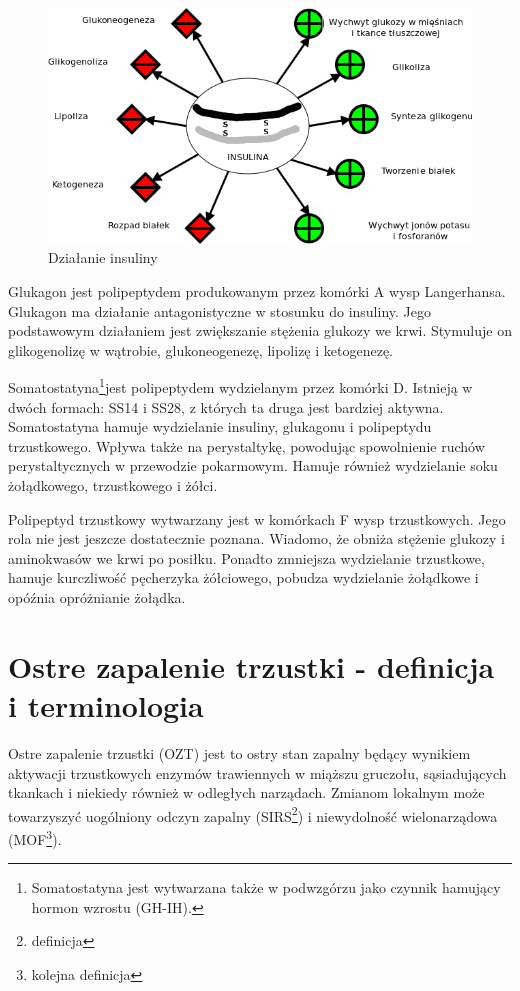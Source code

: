 \documentclass[a4paper, 12pt]{report}
\begin{document}
\begin{figure}[h]
\centering
\includegraphics[scale=0.5]{Insulina_diag2}
\caption{Działanie insuliny}
\end{figure}

Glukagon jest polipeptydem produkowanym przez komórki A wysp
Langerhansa. Glukagon ma działanie antagonistyczne w stosunku do
insuliny. Jego podstawowym działaniem jest zwiększanie stężenia
glukozy we krwi. Stymuluje on glikogenolizę w wątrobie,
glukoneogenezę, lipolizę i ketogenezę.

Somatostatyna\footnote{ Somatostatyna jest wytwarzana także
w podwzgórzu jako czynnik hamujący hormon wzrostu (GH-IH).}jest
polipeptydem wydzielanym
przez komórki D. Istnieją w dwóch formach: SS14 i SS28, z których ta druga
jest bardziej aktywna. Somatostatyna hamuje wydzielanie insuliny,
glukagonu i polipeptydu trzustkowego. Wpływa także na perystaltykę,
powodując spowolnienie ruchów perystaltycznych w przewodzie
pokarmowym. Hamuje również wydzielanie soku żołądkowego, trzustkowego i
żółci.

Polipeptyd trzustkowy wytwarzany jest w komórkach F wysp trzustkowych. Jego
rola nie jest jeszcze dostatecznie poznana. Wiadomo, że obniża
stężenie glukozy i aminokwasów we krwi po posiłku. Ponadto zmniejsza
wydzielanie trzustkowe, hamuje kurczliwość pęcherzyka żółciowego,
pobudza wydzielanie żołądkowe i opóźnia opróżnianie żołądka.

\chapter{Ostre zapalenie trzustki - definicja i terminologia}

Ostre zapalenie trzustki (OZT) jest to ostry stan zapalny będący wynikiem
aktywacji trzustkowych enzymów trawiennych w miąższu gruczołu,
sąsiadujących tkankach i niekiedy również w odległych narządach.
Zmianom lokalnym może towarzyszyć uogólniony odczyn zapalny (SIRS\footnote{definicja}) i
niewydolność wielonarządowa (MOF\footnote{kolejna definicja}). 
\end{document}
